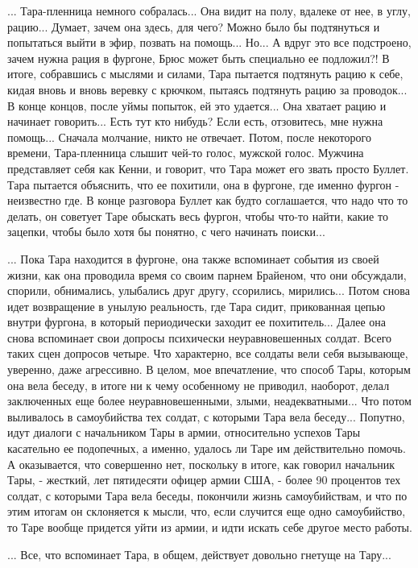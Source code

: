 ... Тара-пленница немного собралась... Она видит на полу, вдалеке от нее, в
углу, рацию... Думает, зачем она здесь, для чего? Можно было бы подтянуться и
попытаться выйти в эфир, позвать на помощь... Но... А вдруг это все подстроено,
зачем нужна рация в фургоне, Брюс может быть специально ее подложил?! В итоге,
собравшись с мыслями и силами, Тара пытается подтянуть рацию к себе, кидая
вновь и вновь веревку с крючком, пытаясь подтянуть рацию за проводок... В конце
концов, после уймы попыток, ей это удается... Она хватает рацию и начинает
говорить... Есть тут кто нибудь? Если есть, отзовитесь, мне нужна помощь...
Сначала молчание, никто не отвечает.  Потом, после некоторого времени,
Тара-пленница слышит чей-то голос, мужской голос. Мужчина представляет себя как
Кенни, и говорит, что Тара может его звать просто Буллет. Тара пытается
объяснить, что ее похитили, она в фургоне, где именно фургон - неизвестно где.
В конце разговора Буллет как будто соглашается, что надо что то делать, он
советует Таре обыскать весь фургон, чтобы что-то найти, какие то зацепки, чтобы
было хотя бы понятно, с чего начинать поиски...

... Пока Тара находится в фургоне, она также вспоминает события из своей жизни,
как она проводила время со своим парнем Брайеном, что они обсуждали, спорили,
обнимались, улыбались друг другу, ссорились, мирились... Потом снова идет
возвращение в унылую реальность, где Тара сидит, прикованная цепью внутри
фургона, в который периодически заходит ее похититель... Далее она снова
вспоминает свои допросы психически неуравновешенных солдат. Всего таких сцен
допросов четыре.  Что характерно, все солдаты вели себя вызывающе, уверенно,
даже агрессивно. В целом, мое впечатление, что способ Тары, которым она вела
беседу, в итоге ни к чему особенному не приводил, наоборот, делал заключенных
еще более неуравновешенными, злыми, неадекватными...  Что потом выливалось в
самоубийства тех солдат, с которыми Тара вела беседу...  Попутно, идут диалоги
с начальником Тары в армии, относительно успехов Тары касательно ее подопечных,
а именно, удалось ли Таре им действительно помочь. А оказывается, что
совершенно нет, поскольку в итоге, как говорил начальник Тары, - жесткий, лет
пятидесяти офицер армии США, - более 90 процентов тех солдат, с которыми Тара
вела беседы, покончили жизнь самоубийствам, и что по этим итогам он склоняется
к мысли, что, если случится еще одно самоубийство, то Таре вообще придется уйти
из армии, и идти искать себе другое место работы.

... Все, что вспоминает Тара, в общем, действует довольно гнетуще на Тару... 


